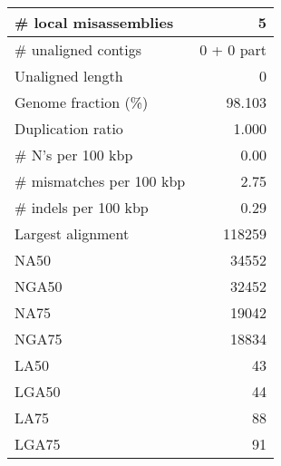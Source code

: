 \documentclass[12pt,a4paper]{article}
\begin{document}
\begin{table}[ht]
\begin{center}
\begin{tabular}{|l*{1}{|r}|}
\# local misassemblies & 5 \\ \hline
\# unaligned contigs & 0 + 0 part \\ \hline
Unaligned length & 0 \\ \hline
Genome fraction (\%) & 98.103 \\ \hline
Duplication ratio & 1.000 \\ \hline
\# N's per 100 kbp & 0.00 \\ \hline
\# mismatches per 100 kbp & 2.75 \\ \hline
\# indels per 100 kbp & 0.29 \\ \hline
Largest alignment & 118259 \\ \hline
NA50 & 34552 \\ \hline
NGA50 & 32452 \\ \hline
NA75 & 19042 \\ \hline
NGA75 & 18834 \\ \hline
LA50 & 43 \\ \hline
LGA50 & 44 \\ \hline
LA75 & 88 \\ \hline
LGA75 & 91 \\ \hline
\end{tabular}
\end{center}
\end{table}
\end{document}
